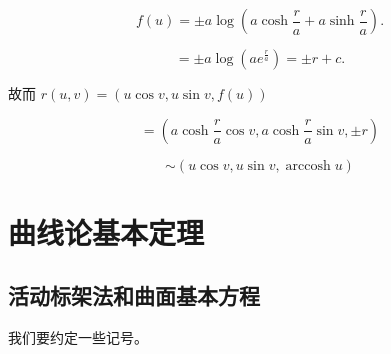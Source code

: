 \documentclass[lang=cn,10pt,thmcnt=section]{elegantbook}
\begin{document}
\[
f(u) = \pm a \log \left( a \cosh \frac{r}{a} + a \sinh \frac{r}{a} \right).
\]

\[
= \pm a \log \left( a e^{\frac{r}{a}} \right) = \pm r + c.
\]

故而 $r(u, v) = (u \cos v, u \sin v, f(u))$

\[
= \left( a \cosh \frac{r}{a} \cos v, a \cosh \frac{r}{a} \sin v, \pm r \right)
\]

\[
\sim (u \cos v, u \sin v, \operatorname{arccosh} u)
\]
\chapter{曲线论基本定理}
\section{活动标架法和曲面基本方程}
我们要约定一些记号。
\end{document}
